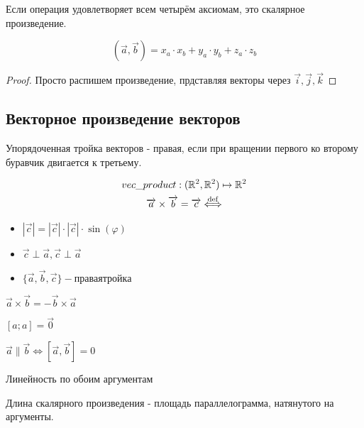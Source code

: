 \documentclass[12pt, a4paper]{article}
\begin{document}
    Если операция удовлетворяет всем четырём аксиомам, это скалярное произведение.

    \begin{theorem}
        \begin{equation}
            (\vec{a}, \vec{b}) = x_a \cdot x_b + y_a \cdot y_b + z_a \cdot z_b            
        \end{equation}
    \end{theorem}
    \begin{proof}
        Просто распишем произведение, прдставляя векторы через $\vec{i}, \vec{j}, \vec{k}$
    \end{proof}

    \subsection{Векторное произведение векторов}
    \begin{definition}
        Упорядоченная тройка векторов - правая, если при вращении первого ко второму буравчик двигается к третьему.
    \end{definition}
    
    \begin{definition}
        \begin{gather}
            vec\_product: ({\mathbb{R}}^2, {\mathbb{R}}^2) \mapsto {\mathbb{R}}^2 \\
            \overrightarrow{a} \times \overrightarrow{b} = \overrightarrow{c} \overset{\mathrm{def}}{\Longleftrightarrow}
        \end{gather}
        \begin{itemize}
            \item $|\vec{c}| = |\vec{c}| \cdot |\vec{c}| \cdot \sin(\varphi)$
            \item $\vec{c} \perp \vec{a}, \vec{c} \perp \vec{a}$
            \item $\{ \vec{a}, \vec{b}, \vec{c} \} - правая тройка$
        \end{itemize}
    \end{definition}

    \begin{property}
        \item $\vec{a} \times \vec{b} = -\vec{b} \times \vec{a}$
        \item $[a; a] = \vec{0}$
        \item $\vec{a} \parallel \vec{b} \Leftrightarrow [\vec{a}, \vec{b}] = 0$
        \item Линейность по обоим аргументам
        \item Длина скалярного произведения - площадь параллелограмма, натянутого на аргументы.
    \end{property}
\end{document}
